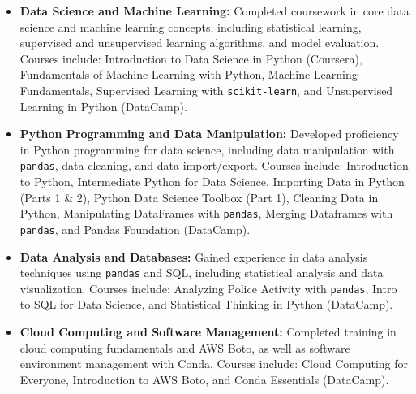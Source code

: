 \documentclass[10pt,a4paper,ragged2e,withhyper]{altacv}
\begin{document}
\begin{itemize}
    \item \textbf{Data Science and Machine Learning:} Completed coursework in core data science and machine learning concepts, including statistical learning, supervised and unsupervised learning algorithms, and model evaluation. Courses include: Introduction to Data Science in Python (Coursera), Fundamentals of Machine Learning with Python, Machine Learning Fundamentals, Supervised Learning with \texttt{scikit-learn}, and Unsupervised Learning in Python (DataCamp).
    \item \textbf{Python Programming and Data Manipulation:} Developed proficiency in Python programming for data science, including data manipulation with \texttt{pandas}, data cleaning, and data import/export. Courses include: Introduction to Python, Intermediate Python for Data Science, Importing Data in Python (Parts 1 \& 2), Python Data Science Toolbox (Part 1), Cleaning Data in Python, Manipulating DataFrames with \texttt{pandas}, Merging Dataframes with \texttt{pandas}, and Pandas Foundation (DataCamp).
    \item \textbf{Data Analysis and Databases:} Gained experience in data analysis techniques using \texttt{pandas} and SQL, including statistical analysis and data visualization. Courses include: Analyzing Police Activity with \texttt{pandas}, Intro to SQL for Data Science, and Statistical Thinking in Python (DataCamp).
    \item \textbf{Cloud Computing and Software Management:} Completed training in cloud computing fundamentals and AWS Boto, as well as software environment management with Conda. Courses include: Cloud Computing for Everyone, Introduction to AWS Boto, and Conda Essentials (DataCamp).
\end{itemize}
\end{document}
